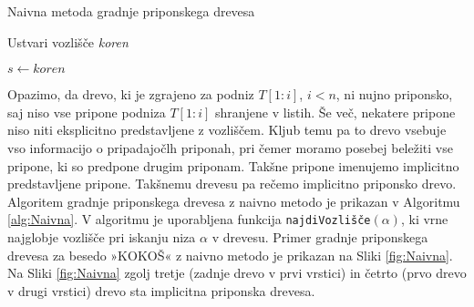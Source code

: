 \begin{algorithm}[htb]

    \caption{Naivna metoda gradnje priponskega drevesa}\label{alg:Naivna}
    {
        {Ustvari vozlišče \textit{koren}}
        
        {$s \leftarrow\textit{koren}$}
        
        
    }
\end{algorithm}

Opazimo, da drevo, ki je zgrajeno za podniz $T[1:i]$, $i< n$, ni nujno priponsko, saj niso vse pripone podniza $T[1:i]$ shranjene v listih. Še več, nekatere pripone niso niti eksplicitno predstavljene z vozliščem. Kljub temu pa to drevo vsebuje vso informacijo o pripadajočlh priponah, pri čemer moramo posebej beležiti vse pripone, ki so predpone drugim priponam. Takšne pripone imenujemo implicitno predstavljene pripone. Takšnemu drevesu pa rečemo implicitno priponsko drevo. Algoritem gradnje priponskega drevesa z naivno metodo je prikazan v Algoritmu \ref{alg:Naivna}. V algoritmu je uporabljena funkcija \texttt{najdiVozlišče}$(\alpha)$, ki vrne najglobje vozlišče pri iskanju niza $\alpha$ v drevesu. Primer gradnje priponskega drevesa za besedo »KOKOŠ« z naivno metodo je prikazan na Sliki \ref{fig:Naivna}. Na Sliki \ref{fig:Naivna} zgolj tretje (zadnje drevo v prvi vrstici) in četrto (prvo drevo v drugi vrstici) drevo sta implicitna priponska drevesa.


